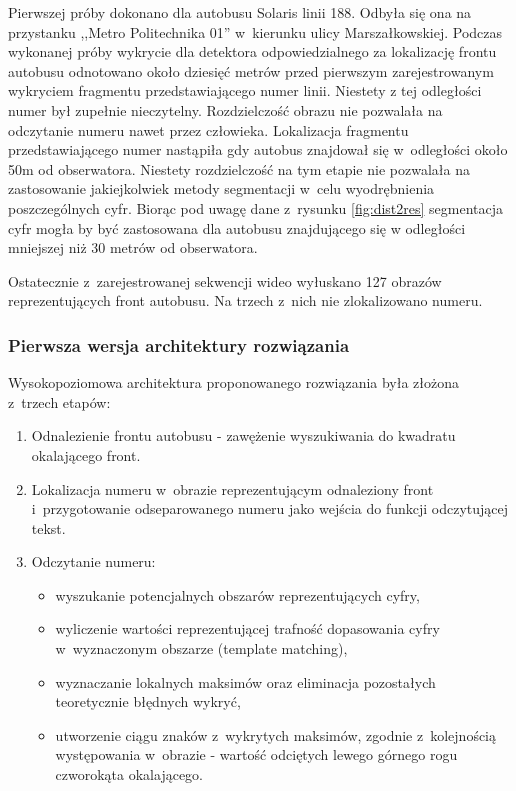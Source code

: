 Pierwszej próby dokonano dla autobusu Solaris linii 188. Odbyła się
ona na przystanku ,,Metro Politechnika 01'' w~kierunku ulicy
Marszałkowskiej.
Podczas wykonanej próby wykrycie dla detektora
odpowiedzialnego za lokalizację frontu autobusu odnotowano około dziesięć
metrów przed pierwszym zarejestrowanym wykryciem fragmentu
przedstawiającego numer linii. Niestety z tej odległości numer był
zupełnie nieczytelny. Rozdzielczość obrazu nie pozwalała na odczytanie
numeru nawet przez człowieka.
Lokalizacja fragmentu przedstawiającego numer nastąpiła gdy autobus
znajdował się w~odległości około 50m od obserwatora. Niestety
rozdzielczość na tym etapie nie pozwalała na zastosowanie jakiejkolwiek
metody segmentacji w~celu wyodrębnienia poszczególnych cyfr. Biorąc pod
uwagę dane z~rysunku \ref{fig:dist2res} segmentacja cyfr mogła by być
zastosowana dla autobusu znajdującego się w odległości mniejszej niż
30 metrów od obserwatora. 

Ostatecznie z~zarejestrowanej sekwencji wideo wyłuskano 127 obrazów
reprezentujących front autobusu. Na trzech z~nich nie zlokalizowano
numeru. 

\subsubsection{Pierwsza wersja architektury rozwiązania}

Wysokopoziomowa architektura proponowanego rozwiązania była złożona 
z~trzech etapów:
\begin{enumerate}
    \item Odnalezienie frontu autobusu - zawężenie wyszukiwania 
        do kwadratu okalającego front.
    \item Lokalizacja numeru w~obrazie reprezentującym odnaleziony
        front i~przygotowanie odseparowanego numeru jako wejścia
        do funkcji odczytującej tekst.
    \item Odczytanie numeru:
        \begin{itemize}
            \item wyszukanie potencjalnych obszarów reprezentujących
                cyfry,
            \item wyliczenie wartości reprezentującej trafność
                dopasowania cyfry w~wyznaczonym obszarze (template
                matching),
            \item wyznaczanie lokalnych maksimów oraz eliminacja 
                pozostałych teoretycznie błędnych wykryć,
            \item utworzenie ciągu znaków z~wykrytych maksimów,
                zgodnie z~kolejnością występowania w~obrazie -
                wartość odciętych lewego górnego rogu czworokąta
                okalającego.
        \end{itemize}
\end{enumerate}

